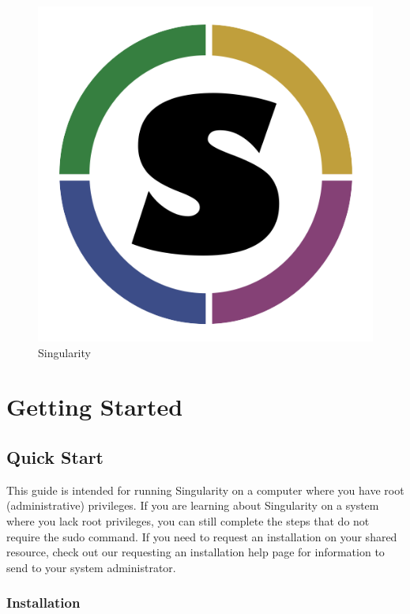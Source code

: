 \documentclass[a4paper]{article}
\date{\vspace{-5ex}}
\begin{document}
\begin{figure}
\centering
\includegraphics{logo.png}
\caption{Singularity}
\end{figure}

\justify


\section{Getting Started}
\subsection{Quick Start}
\label{sec:quickstart}

This guide is intended for running Singularity on a computer where you have root (administrative) privileges. If you are learning about Singularity on a system where you lack root privileges, you can still complete the steps that do not require the sudo command. If you need to request an installation on your shared resource, check out our requesting an installation help page for information to send to your system administrator.

\newpage


\tableofcontents
\newpage

\subsubsection{Installation}
\end{document}
